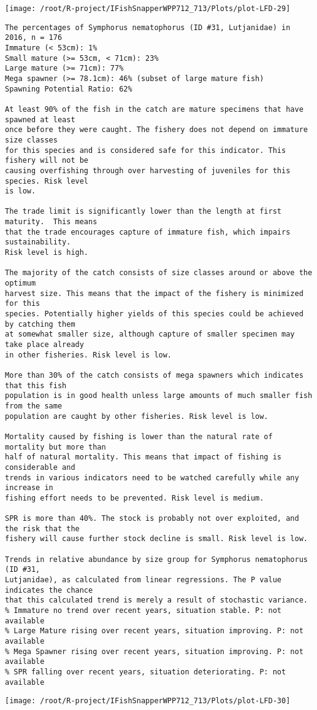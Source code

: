 \documentclass{report}\usepackage[]{graphicx}\usepackage[]{color}
\makeatletter
\def\maxwidth{ %
  \ifdim\Gin@nat@width>\linewidth
    \linewidth
  \else
    \Gin@nat@width
  \fi
}
\newenvironment{kframe}{%
 \def\at@end@of@kframe{}%
 \ifinner\ifhmode%
  \def\at@end@of@kframe{\end{minipage}}%
  \begin{minipage}{\columnwidth}%
 \fi\fi%
 \def\FrameCommand##1{\hskip\@totalleftmargin \hskip-\fboxsep
 \colorbox{shadecolor}{##1}\hskip-\fboxsep
     \hskip-\linewidth \hskip-\@totalleftmargin \hskip\columnwidth}%
 \MakeFramed {\advance\hsize-\width
   \@totalleftmargin\z@ \linewidth\hsize
   \@setminipage}}%
 {\par\unskip\endMakeFramed%
 \at@end@of@kframe}
\newenvironment{knitrout}{}{} %
\makeatother
\begin{document}
\begin{knitrout}
\texttt{[image: /root/R-project/IFishSnapperWPP712\_713/Plots/plot-LFD-29]} 
\begin{kframe}\begin{verbatim}
The percentages of Symphorus nematophorus (ID #31, Lutjanidae) in 2016, n = 176
Immature (< 53cm): 1%
Small mature (>= 53cm, < 71cm): 23%
Large mature (>= 71cm): 77%
Mega spawner (>= 78.1cm): 46% (subset of large mature fish)
Spawning Potential Ratio: 62%
 
At least 90% of the fish in the catch are mature specimens that have spawned at least
once before they were caught. The fishery does not depend on immature size classes
for this species and is considered safe for this indicator. This fishery will not be
causing overfishing through over harvesting of juveniles for this species. Risk level
is low.

The trade limit is significantly lower than the length at first maturity.  This means
that the trade encourages capture of immature fish, which impairs sustainability.
Risk level is high.

The majority of the catch consists of size classes around or above the optimum
harvest size. This means that the impact of the fishery is minimized for this
species. Potentially higher yields of this species could be achieved by catching them
at somewhat smaller size, although capture of smaller specimen may take place already
in other fisheries. Risk level is low.

More than 30% of the catch consists of mega spawners which indicates that this fish
population is in good health unless large amounts of much smaller fish from the same
population are caught by other fisheries. Risk level is low.
 
Mortality caused by fishing is lower than the natural rate of mortality but more than
half of natural mortality. This means that impact of fishing is considerable and
trends in various indicators need to be watched carefully while any increase in
fishing effort needs to be prevented. Risk level is medium.
 
SPR is more than 40%. The stock is probably not over exploited, and the risk that the
fishery will cause further stock decline is small. Risk level is low.
 
Trends in relative abundance by size group for Symphorus nematophorus (ID #31,
Lutjanidae), as calculated from linear regressions. The P value indicates the chance
that this calculated trend is merely a result of stochastic variance.
% Immature no trend over recent years, situation stable. P: not available
% Large Mature rising over recent years, situation improving. P: not available
% Mega Spawner rising over recent years, situation improving. P: not available
% SPR falling over recent years, situation deteriorating. P: not available
\end{verbatim}
\end{kframe}
\texttt{[image: /root/R-project/IFishSnapperWPP712\_713/Plots/plot-LFD-30]} 


\end{knitrout}
\end{document}
